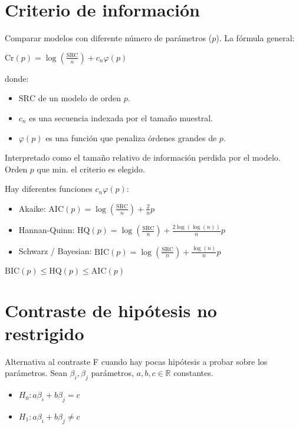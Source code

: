 \documentclass[10pt, a4paper, landscape]{article}
\newcommand{\SSR}{\mathrm{SRC}}
\begin{document}
\begin{multicols}{3}
		\columnbreak
		
		\section*{Criterio de información}
		
		Comparar modelos con diferente número de parámetros ($p$). La fórmula general:
		
		\begin{center}
			$\mathrm{Cr}(p) = \log(\frac{\SSR}{n}) + c_{n} \varphi (p)$
		\end{center}
		
		donde:
		
		\begin{itemize}[leftmargin=*]
			\item $\SSR$ de un modelo de orden $p$.
			\item $c_{n}$ es una secuencia indexada por el tamaño muestral.
			\item $\varphi(p)$ es una función que penaliza órdenes grandes de $p$.
		\end{itemize}
		
		Interpretado como el tamaño relativo de información perdida por el modelo. Orden $p$ que min. el criterio es elegido.
		
		Hay diferentes funciones $c_{n} \varphi(p)$:
		
		\begin{itemize}[leftmargin=*]
			\item Akaike: $\mathrm{AIC}(p) = \log(\frac{\SSR}{n}) + \frac{2}{n}p$
			\item Hannan-Quinn: $\mathrm{HQ}(p) = \log(\frac{\SSR}{n}) + \frac{2 \log(\log(n))}{n}p$
			\item Schwarz / Bayesian: $\mathrm{BIC}(p) = \log(\frac{\SSR}{n}) + \frac{\log(n)}{n}p$
		\end{itemize}
		
		$\mathrm{BIC}(p) \leq \mathrm{HQ}(p) \leq \mathrm{AIC}(p)$
		
		\section*{Contraste de hipótesis no restrigido}
		
		Alternativa al contraste F cuando hay pocas hipótesis a probar sobre los parámetros. Sean $\beta_{i}, \beta_{j}$ parámetros, $a, b, c \in \mathbb{R}$ constantes.
		
		\begin{itemize}[leftmargin=*]
			\item $H_{0}: a \beta_{i} + b \beta_{j} = c$
			\item $H_{1}: a \beta_{i} + b \beta_{j} \neq c$
		\end{itemize}
		

\end{multicols}
\end{document}
